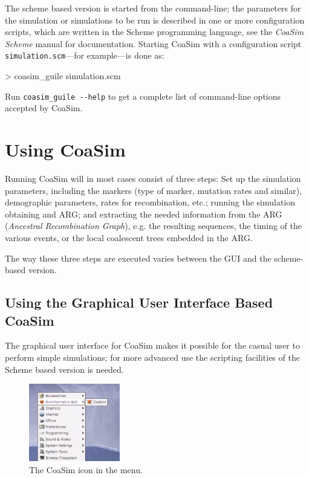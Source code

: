 \documentclass{manual}
\begin{document}
The scheme based version is started from the command-line; the
parameters for the simulation or simulations to be run is described in
one or more configuration scripts, which are written in the Scheme
programming language, see the \textit{CoaSim Scheme} manual for
documentation.  Starting CoaSim with a configuration script
\verb?simulation.scm?---for example---is done as:
\begin{code}
> coasim_guile simulation.scm
\end{code}
Run \verb?coasim_guile --help? to get a complete list of command-line
options accepted by CoaSim.


\section{Using CoaSim}

Running CoaSim will in most cases consist of three steps: Set up the
simulation parameters, including the markers (type of marker, mutation
rates and similar), demographic parameters, rates for recombination,
etc.; running the simulation obtaining and ARG; and extracting the
needed information from the ARG (\emph{Ancestral Recombination
  Graph}), e.g. the resulting sequences, the timing of the various
events, or the local coalescent trees embedded in the ARG.

The way these three steps are executed varies between the GUI and the
scheme-based version.


\subsection{Using the Graphical User Interface Based CoaSim}
\label{sec:using-graphical-user}
The graphical user interface for CoaSim makes it possible for the
casual user to perform simple simulations; for more advanced use the
scripting facilities of the Scheme based version is needed.  

\begin{figure}
  \centering
  \includegraphics{figs/coasim-menu}
  \caption{The CoaSim icon in the menu.}
  \label{fig:menu}
\end{figure}
\end{document}
